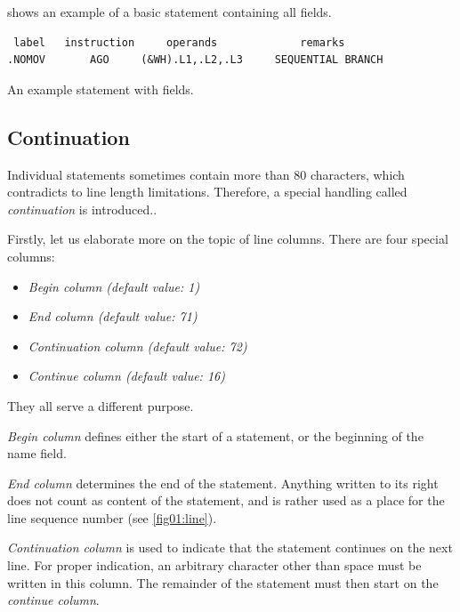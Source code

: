  shows an example of a basic statement containing all fields.
\begin{listing}

\begin{verbatim}
 label   instruction     operands             remarks
.NOMOV       AGO     (&WH).L1,.L2,.L3     SEQUENTIAL BRANCH
\end{verbatim}
\caption{An example statement with fields.}
\label{lst:example}
\end{listing}

\subsection{Continuation}

Individual statements sometimes contain more than 80 characters, which contradicts to line length limitations. Therefore, a special handling called \emph{continuation} is introduced..

Firstly, let us elaborate more on the topic of line columns. There are four special columns:
\begin{itemize}
	\item \emph{Begin column (default value: 1)}
	
	\item \emph{End column (default value: 71)}
	
	\item \emph{Continuation column (default value: 72)}
	
	\item \emph{Continue column (default value: 16)}
\end{itemize}
They all serve a different purpose.

\textit{Begin column} defines either the start of a statement, or the beginning of the name field.

\textit{End column} determines the end of the statement. Anything written to its right does not count as content of the statement, and is rather used as a place for the line sequence number (see \ref{fig01:line}). 

\textit{Continuation column} is used to indicate that the statement continues on the next line. For proper indication, an arbitrary character other than space must be written in this column. The remainder of the statement must then start on the \textit{continue column}.


